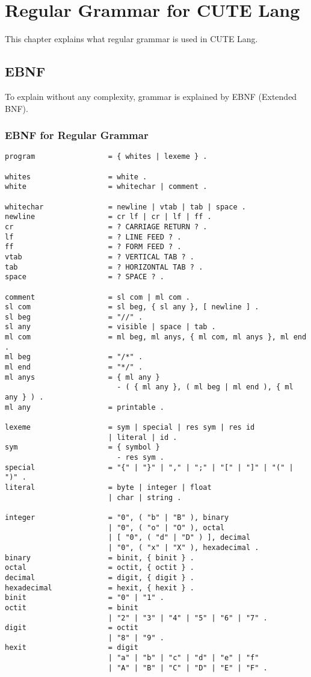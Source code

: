 \documentclass[a4paper, article, oneside, 10pt]{memoir}
\begin{document}
\pagestyle{ruled}
\chapter{Regular Grammar for CUTE Lang}
This chapter explains what regular grammar is used in CUTE Lang.

\section{EBNF}
To explain without any complexity, grammar is explained by EBNF (Extended BNF).

\subsection{EBNF for Regular Grammar}

\begin{verbatim}
program                 = { whites | lexeme } .

whites                  = white .
white                   = whitechar | comment .

whitechar               = newline | vtab | tab | space .
newline                 = cr lf | cr | lf | ff .
cr                      = ? CARRIAGE RETURN ? .
lf                      = ? LINE FEED ? .
ff                      = ? FORM FEED ? .
vtab                    = ? VERTICAL TAB ? .
tab                     = ? HORIZONTAL TAB ? .
space                   = ? SPACE ? .

comment                 = sl com | ml com .
sl com                  = sl beg, { sl any }, [ newline ] .
sl beg                  = "//" .
sl any                  = visible | space | tab .
ml com                  = ml beg, ml anys, { ml com, ml anys }, ml end .
ml beg                  = "/*" .
ml end                  = "*/" .
ml anys                 = { ml any }
                          - ( { ml any }, ( ml beg | ml end ), { ml any } ) .
ml any                  = printable .

lexeme                  = sym | special | res sym | res id
                        | literal | id .
sym                     = { symbol }
                          - res sym .
special                 = "{" | "}" | "," | ";" | "[" | "]" | "(" | ")" .
literal                 = byte | integer | float
                        | char | string .

integer                 = "0", ( "b" | "B" ), binary
                        | "0", ( "o" | "O" ), octal
                        | [ "0", ( "d" | "D" ) ], decimal
                        | "0", ( "x" | "X" ), hexadecimal .
binary                  = binit, { binit } .
octal                   = octit, { octit } .
decimal                 = digit, { digit } .
hexadecimal             = hexit, { hexit } .
binit                   = "0" | "1" .
octit                   = binit
                        | "2" | "3" | "4" | "5" | "6" | "7" .
digit                   = octit
                        | "8" | "9" .
hexit                   = digit
                        | "a" | "b" | "c" | "d" | "e" | "f"
                        | "A" | "B" | "C" | "D" | "E" | "F" .


\end{verbatim}
\end{document}
